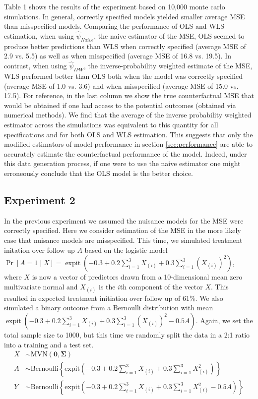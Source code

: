 Table 1 shows the results of the experiment based on 10,000 monte carlo simulations. In general, correctly specified models yielded smaller average MSE than misspecified models. Comparing the performance of OLS and WLS estimation, when using $\widehat{\psi}_{Naive}$, the naive estimator of the MSE, OLS seemed to produce better predictions than WLS when correctly specified (average MSE of 2.9 vs. 5.5) as well as when misspecified (average MSE of 16.8 vs. 19.5). In contrast, when using $\widehat{\psi}_{IPW}$, the inverse-probability weighted estimate of the MSE, WLS performed better than OLS both when the model was correctly specified (average MSE of 1.0 vs. 3.6) and when misspecified (average MSE of 15.0 vs. 17.5). For reference, in the last column we show the true counterfactual MSE that would be obtained if one had access to the potential outcomes (obtained via numerical methods). We find that the average of the inverse probability weighted estimator across the simulations was equivalent to this quantity for all specifications and for both OLS and WLS estimation. This suggests that only the modified estimators of model performance in section \ref{sec:performance} are able to accurately estimate the counterfactual performance of the model. Indeed, under this data generation process, if one were to use the naive estimator one might erroneously conclude that the OLS model is the better choice.


\subsection{Experiment 2}

In the previous experiment we assumed the nuisance models for the MSE were correctly specified. Here we consider estimation of the MSE in the more likely case that nuisance models are  misspecified. This time, we simulated treatment initation over follow up $A$ based on the logistic model $\operatorname{Pr}[A=1 \mid X]=\operatorname{expit}\left(-0.3+0.2 \sum_{i=1}^3 X_{(i)}+0.3 \sum_{i=1}^3\left(X_{(i)}\right)^2\right)$, where $X$ is now a vector of predictors drawn from a 10-dimensional mean zero multivariate normal and $X_{(i)}$ is the $i$th component of the vector $X$. This resulted in expected treatment initiation over follow up of 61\%. We also simulated a binary outcome from a Bernoulli distribution with mean $\operatorname{expit}\left(-0.3+0.2 \sum_{i=1}^3 X_{(i)}+0.3 \sum_{i=1}^3\left(X_{(i)}\right)^2 - 0.5A \right)$. Again, we set the total sample size to 1000, but this time we randomly split the data in a 2:1 ratio into a training and a test set. 
\begin{align*}
    X & \sim \text{MVN}(\mathbf{0}, \boldsymbol{\Sigma}) \\
    A & \sim \text{Bernoulli}\left\{\text{expit}\left(-0.3 + 0.2 \sum_{i=1}^3 X_{(i)}+ 0.3 \sum_{i=1}^3 X_{(i)}^2\right)\right\} \\
    Y & \sim \text{Bernoulli}\left\{\text{expit}\left(-0.3 + 0.2 \sum_{i=1}^3 X_{(i)}+ 0.3 \sum_{i=1}^3 X_{(i)}^2 - 0.5 A\right)\right\}
\end{align*}

